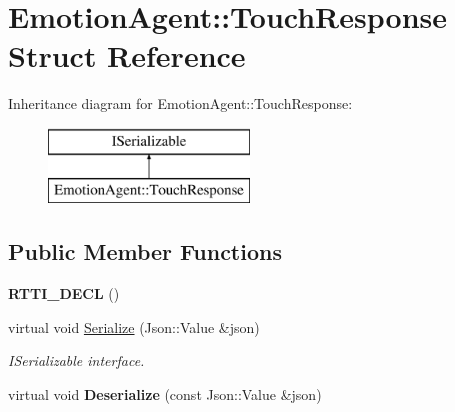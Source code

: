 \hypertarget{struct_emotion_agent_1_1_touch_response}{}\section{Emotion\+Agent\+:\+:Touch\+Response Struct Reference}
\label{struct_emotion_agent_1_1_touch_response}
Inheritance diagram for Emotion\+Agent\+:\+:Touch\+Response\+:\begin{figure}[H]
\begin{center}
\leavevmode
\includegraphics[height=2.000000cm]{struct_emotion_agent_1_1_touch_response}
\end{center}
\end{figure}
\subsection*{Public Member Functions}
\begin{DoxyCompactItemize}
\item 
\mbox{\label{struct_emotion_agent_1_1_touch_response_ae026dad97de62105dd2bc2cb8f9bf69c}} 
{\bfseries R\+T\+T\+I\+\_\+\+D\+E\+CL} ()
\item 
\mbox{\label{struct_emotion_agent_1_1_touch_response_a2bcc19fcffc98eb1826a10ca56491deb}} 
virtual void \hyperlink{struct_emotion_agent_1_1_touch_response_a2bcc19fcffc98eb1826a10ca56491deb}{Serialize} (Json\+::\+Value \&json)
\begin{DoxyCompactList}\small\item\em I\+Serializable interface. \end{DoxyCompactList}\item 
\mbox{\label{struct_emotion_agent_1_1_touch_response_a87dedf07b1377c4c4c5844667277540d}} 
virtual void {\bfseries Deserialize} (const Json\+::\+Value \&json)
\end{DoxyCompactItemize}
